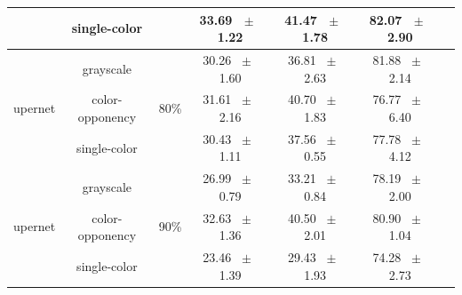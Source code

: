 \begin{table}[h]
\begin{tabular}{@{}lccc ccc@{}}
    & single-color & & 33.69 ~$\pm$~ 1.22 & 41.47 ~$\pm$~ 1.78 & 82.07 ~$\pm$~ 2.90 \\
    \midrule
    \multirow{3}{*}{upernet} & grayscale & \multirow{3}{*}{80\%} & 30.26 ~$\pm$~ 1.60 & 36.81 ~$\pm$~ 2.63 & 81.88 ~$\pm$~ 2.14 \\
    & color-opponency & & 31.61 ~$\pm$~ 2.16 & 40.70 ~$\pm$~ 1.83 & 76.77 ~$\pm$~ 6.40 \\
    & single-color & & 30.43 ~$\pm$~ 1.11 & 37.56 ~$\pm$~ 0.55 & 77.78 ~$\pm$~ 4.12 \\
    \midrule
    \multirow{3}{*}{upernet} & grayscale & \multirow{3}{*}{90\%} & 26.99 ~$\pm$~ 0.79 & 33.21 ~$\pm$~ 0.84 & 78.19 ~$\pm$~ 2.00 \\
    & color-opponency & & 32.63 ~$\pm$~ 1.36 & 40.50 ~$\pm$~ 2.01 & 80.90 ~$\pm$~ 1.04 \\
    & single-color & & 23.46 ~$\pm$~ 1.39 & 29.43 ~$\pm$~ 1.93 & 74.28 ~$\pm$~ 2.73 \\
    \midrule
    \bottomrule
  \end{tabular}
  \label{tab:sparse_upernet_acdc_rain}
\end{table}